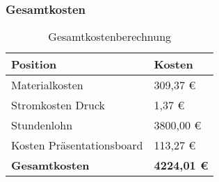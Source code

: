 \subsubsection{Gesamtkosten}\label{ku_kosten_gesamt}
\begin{center}
\begin{table}[H]
    \begin{tabularx}{\textwidth}{|p{9.9cm}|p{4.7cm}|}
        \hline
 	    \textbf{Position} & \textbf{Kosten} \\
 	    \hline
 	    \hline
 	    Materialkosten & 309,37 \euro{} \\
	    \hline
	    Stromkosten Druck & 1,37 \euro{} \\
	    \hline
	    Stundenlohn & 3800,00 \euro{} \\
	    \hline
	    Kosten Präsentationsboard & 113,27 \euro{} \\
	    \hline
	    \hline
	    \textbf{Gesamtkosten} & \textbf{4224,01 \euro{}} \\ %
	    \hline
    \end{tabularx}
    \caption{Gesamtkostenberechnung}
    \label{tab:ku_gesamtkostenberechnung}
\end{table}
\end{center}